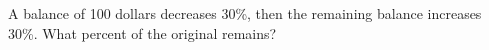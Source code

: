 A balance of 100 dollars decreases 30\%, then the remaining balance increases 30\%. What percent of the original remains?
